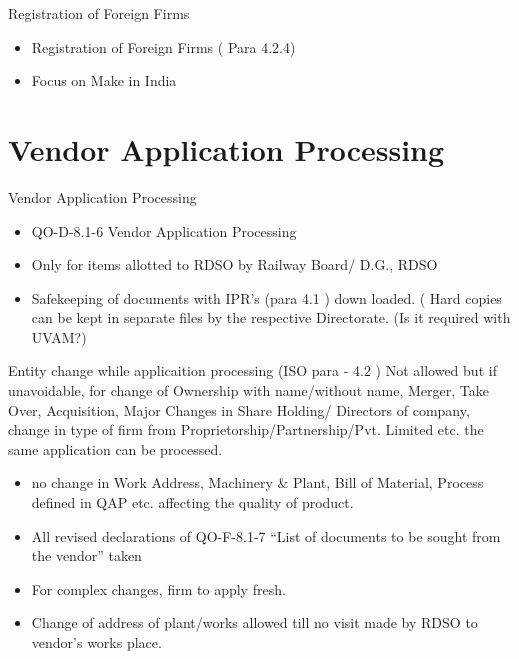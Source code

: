 \documentclass[
  10pt,
  ignorenonframetext,
  aspectratio=43,
]{beamer}
\begin{document}
\begin{frame}{Registration of Foreign Firms}
\protect\hypertarget{registration-of-foreign-firms}{}
\begin{itemize}
\item
  Registration of Foreign Firms ( Para 4.2.4)
\item
  Focus on Make in India
\end{itemize}
\end{frame}

\hypertarget{vendor-application-processing}{%
\section{Vendor Application
Processing}\label{vendor-application-processing}}

\begin{frame}{Vendor Application Processing}
\begin{itemize}
\item
  QO-D-8.1-6 Vendor Application Processing
\item
  Only for items allotted to RDSO by Railway Board/ D.G., RDSO
\item
  Safekeeping of documents with IPR's (para 4.1 ) down loaded. ( Hard
  copies can be kept in separate files by the respective Directorate.
  (Is it required with UVAM?)
\end{itemize}
\end{frame}

\begin{frame}{Entity change while applicaition processing}
\protect\hypertarget{entity-change-while-applicaition-processing}{}
(ISO para - 4.2 ) Not allowed but if unavoidable, for change of
Ownership with name/without name, Merger, Take Over, Acquisition, Major
Changes in Share Holding/ Directors of company, change in type of firm
from Proprietorship/Partnership/Pvt. Limited etc. the same application
can be processed.

\begin{itemize}
\item
  no change in Work Address, Machinery \& Plant, Bill of Material,
  Process defined in QAP etc. affecting the quality of product.
\item
  All revised declarations of QO-F-8.1-7 ``List of documents to be
  sought from the vendor'' taken
\item
  For complex changes, firm to apply fresh.
\item
  Change of address of plant/works allowed till no visit made by RDSO to
  vendor's works place.
\end{itemize}
\end{frame}
\end{document}
